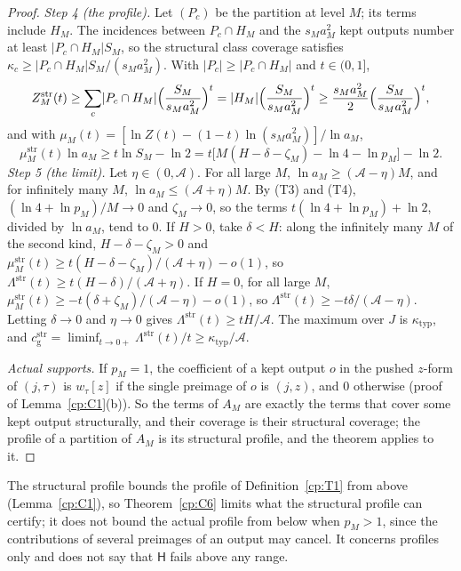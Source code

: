 \documentclass[11pt]{article}
\theoremstyle{definition}
\theoremstyle{remark}
\newcommand{\abs}[1]{\lvert #1\rvert}
\newcommand{\Hyp}{\mathsf{H}}                 %
\newcommand{\Lam}{\Lambda}                    %
\newcommand{\cg}{c_{\mathrm g}}               %
\newcommand{\Tcond}[1]{\textup{(T#1)}}        %
\newcommand{\Acs}{\mathcal A}                %
\newcommand{\ktyp}{\kappa_{\mathrm{typ}}}    %
\begin{document}
\begin{proof}
\emph{Step 4 (the profile).} Let $(P_c)$ be the partition at level $M$; its terms include $H_M$. The incidences between $P_c\cap H_M$ and the $s_Ma_M^2$ kept outputs number at least $\abs{P_c\cap H_M}S_M$, so the structural class coverage satisfies $\kappa_c\ge\abs{P_c\cap H_M}S_M/(s_Ma_M^2)$. With $\abs{P_c}\ge\abs{P_c\cap H_M}$ and $t\in(0,1]$,
\[
Z^{\mathrm{str}}_M(t)\ge\sum_c\abs{P_c\cap H_M}\Bigl(\frac{S_M}{s_Ma_M^2}\Bigr)^t=\abs{H_M}\Bigl(\frac{S_M}{s_Ma_M^2}\Bigr)^t\ge\frac{s_Ma_M^2}2\Bigl(\frac{S_M}{s_Ma_M^2}\Bigr)^t,
\]
and with $\mu_M(t)=[\ln Z(t)-(1-t)\ln(s_Ma_M^2)]/\ln a_M$,
\[
\mu^{\mathrm{str}}_M(t)\ln a_M\ge t\ln S_M-\ln2=t\bigl[M(H-\delta-\zeta_M)-\ln4-\ln p_M\bigr]-\ln2 .
\]
\emph{Step 5 (the limit).} Let $\eta\in(0,\Acs)$. For all large $M$, $\ln a_M\ge(\Acs-\eta)M$, and for infinitely many $M$, $\ln a_M\le(\Acs+\eta)M$. By \Tcond3{} and \Tcond4, $(\ln4+\ln p_M)/M\to0$ and $\zeta_M\to0$, so the terms $t(\ln4+\ln p_M)+\ln2$, divided by $\ln a_M$, tend to $0$. If $H>0$, take $\delta<H$: along the infinitely many $M$ of the second kind, $H-\delta-\zeta_M>0$ and $\mu^{\mathrm{str}}_M(t)\ge t(H-\delta-\zeta_M)/(\Acs+\eta)-o(1)$, so $\Lam^{\mathrm{str}}(t)\ge t(H-\delta)/(\Acs+\eta)$. If $H=0$, for all large $M$, $\mu^{\mathrm{str}}_M(t)\ge-t(\delta+\zeta_M)/(\Acs-\eta)-o(1)$, so $\Lam^{\mathrm{str}}(t)\ge-t\delta/(\Acs-\eta)$. Letting $\delta\to0$ and $\eta\to0$ gives $\Lam^{\mathrm{str}}(t)\ge tH/\Acs$. The maximum over $J$ is $\ktyp$, and $\cg^{\mathrm{str}}=\liminf_{t\to0+}\Lam^{\mathrm{str}}(t)/t\ge\ktyp/\Acs$.

\emph{Actual supports.} If $p_M=1$, the coefficient of a kept output $o$ in the pushed $z$-form of $(j,\tau)$ is $w_\tau[z]$ if the single preimage of $o$ is $(j,z)$, and $0$ otherwise (proof of Lemma~\ref{cp:C1}(b)). So the terms of $A_M$ are exactly the terms that cover some kept output structurally, and their coverage is their structural coverage; the profile of a partition of $A_M$ is its structural profile, and the theorem applies to it.
\end{proof}

The structural profile bounds the profile of Definition~\ref{cp:T1} from above (Lemma~\ref{cp:C1}), so Theorem~\ref{cp:C6} limits what the structural profile can certify; it does not bound the actual profile from below when $p_M>1$, since the contributions of several preimages of an output may cancel. It concerns profiles only and does not say that $\Hyp$ fails above any range.
\end{document}
